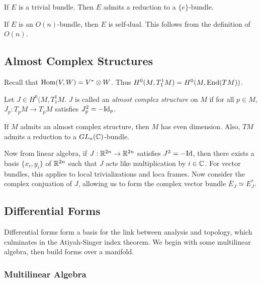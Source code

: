 \documentclass[twoside, 10pt]{article}
\begin{document}
    \begin{exm} If $E$ is a trivial bundle. Then $E$ admits a reduction to a
    $\{e\}$-bundle.  \end{exm}

    \begin{exm} If $E$ is an $O(n)$-bundle, then $E$ is self-dual. This follows
    from the definition of $O(n)$.  \end{exm}

    \subsection{Almost Complex Structures}%

    Recall that $\operatorname{Hom}(V,W) = V^* \otimes W$. Thus $H^0(M, T_1^1M) =
    H^0(M,\operatorname{End}(TM))$.

    \begin{defn} Let $J \in H^0(M, T_1^1M$. $J$ is called an \textit{almost
    complex structure} on $M$ if for all $p \in M$, $J_p: T_pM \to T_pM$
satisfies $J_p^2 = -\mathrm{Id}_p$.  \end{defn}

    \begin{prop} If $M$ admits an almost complex structure, then $M$ has even
    dimension. Also, $TM$ admits a reduction to a $GL_n(\mathbb{C})$-bundle.
\end{prop}

    Now from linear algebra, if $J:\mathbb{R}^{2n} \to \mathbb{R}^{2n}$ satisfies $J^2 =
    -\mathrm{Id}$, then there exists a basis $\{x_i,y_i\}$ of $\mathbb{R}^{2n}$ such that
    $J$ acts like multiplication by $i \in \mathbb{C}$. For vector bundles, this
    applies to local trivializations and loca frames. Now consider the complex
    conjuation of $J$, allowing us to form the complex vector bundle
    $\overline{E}_J \simeq E_J^*$.

    \subsection{Differential Forms}%

    Differential forms form a basis for the link between analysis and topology,
    which culminates in the Atiyah-Singer index theorem. We begin with some
    multilinear algebra, then build forms over a manifold.

    \subsubsection{Multilinear Algebra}%
\end{document}
